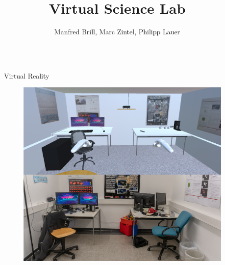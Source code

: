 \documentclass[final,hyperref={pdfpagelabels=false}]{beamer}
\title{\huge Virtual Science Lab}
\author{Manfred Brill, Marc Zintel, Philipp Lauer}
\institute{Department of Computer Science and Microsystems Technology}
\begin{document}

\begin{frame}[t] %

\begin{columns}[t] %

\begin{column}{.02\textwidth}\end{column} %

\begin{column}{.465\textwidth} %


\begin{block}{Virtual Reality}
    \begin{figure}
    	\centering
    	\includegraphics[width=0.95\linewidth]{labor_vgl}

    \end{figure}
    
    \vspace{20px}
\end{block}

\vspace{0.3cm}


\end{column}
\end{columns}
\end{frame}
\end{document}
